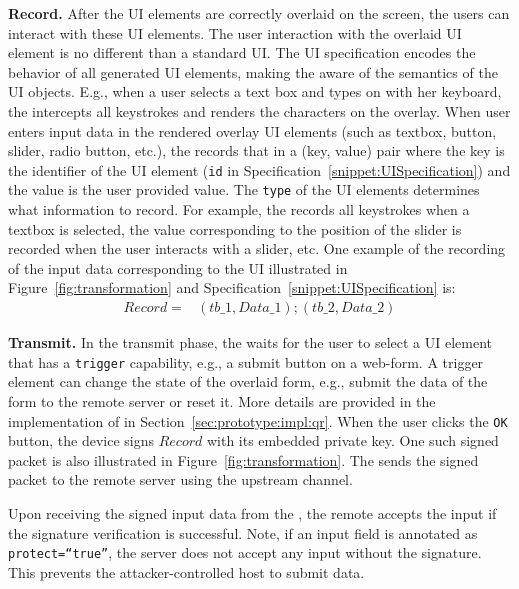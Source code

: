 \begin{mylist}
\item \textbf{Record.} After the UI elements are correctly overlaid on the screen, the users can interact with these UI elements. The user interaction with the overlaid UI element is no different than a standard UI. The UI specification encodes the behavior of all generated UI elements, making the \device aware of the semantics of the UI objects. E.g., when a user selects a text box and types on with her keyboard, the \device intercepts all keystrokes and renders the characters on the overlay.
When user enters input data in the rendered overlay UI elements (such as textbox, button, slider, radio button, etc.), the \device records that in a (key, value) pair where the key is the identifier of the UI element (\texttt{id} in Specification~\ref{snippet:UISpecification}) and the value is the user provided value. The \texttt{type} of the UI elements determines what information to record. For example, the \device records all keystrokes when a textbox is selected, the value corresponding to the position of the slider is recorded when the user interacts with a slider, etc. One example of the recording of the input data corresponding to the UI illustrated in Figure~\ref{fig:transformation} and Specification~\ref{snippet:UISpecification} is: 
\begin{align*}
Record = & (tb\_1, Data\_1);(tb\_2,Data\_2)
\end{align*}

\item \textbf{Transmit.} In the transmit phase, the \device waits for the user to select a UI element that has a \texttt{trigger} capability, e.g., a submit button on a web-form. A trigger element can change the state of the overlaid form, e.g., submit the data of the form to the remote server or reset it. More details are provided in the implementation of \name in Section~\ref{sec:prototype:impl:qr}. When the user clicks the \texttt{OK} button, the device signs $Record$ with its embedded private key. One such signed packet is also illustrated in Figure~\ref{fig:transformation}. The \device sends the signed packet to the remote server using the upstream channel.
\end{mylist} 

Upon receiving the signed input data from the \device, the remote accepts the input if the signature verification is successful. Note, if an input field is annotated as \texttt{protect=``true''}, the server does not accept any input without the \device signature. This prevents the attacker-controlled host to submit data. 

